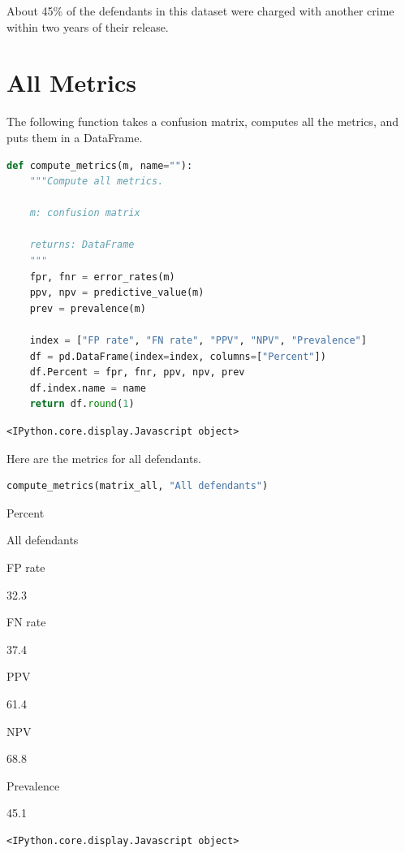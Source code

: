 About 45\% of the defendants in this dataset were charged with another
crime within two years of their release.

\hypertarget{all-metrics}{%
\section{All Metrics}\label{all-metrics}}

The following function takes a confusion matrix, computes all the
metrics, and puts them in a DataFrame.

\begin{lstlisting}[language=Python,style=source]
def compute_metrics(m, name=""):
    """Compute all metrics.

    m: confusion matrix

    returns: DataFrame
    """
    fpr, fnr = error_rates(m)
    ppv, npv = predictive_value(m)
    prev = prevalence(m)

    index = ["FP rate", "FN rate", "PPV", "NPV", "Prevalence"]
    df = pd.DataFrame(index=index, columns=["Percent"])
    df.Percent = fpr, fnr, ppv, npv, prev
    df.index.name = name
    return df.round(1)
\end{lstlisting}

\begin{lstlisting}[style=output]
<IPython.core.display.Javascript object>
\end{lstlisting}

Here are the metrics for all defendants.

\begin{lstlisting}[language=Python,style=source]
compute_metrics(matrix_all, "All defendants")
\end{lstlisting}

Percent

All defendants

FP rate

32.3

FN rate

37.4

PPV

61.4

NPV

68.8

Prevalence

45.1

\begin{lstlisting}[style=output]
<IPython.core.display.Javascript object>
\end{lstlisting}

